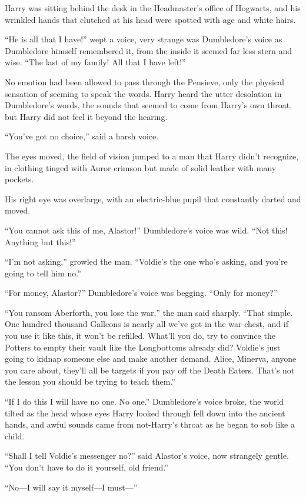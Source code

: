 \begin{em}
Harry was sitting behind the desk in the Headmaster’s office of Hogwarts, and his wrinkled hands that clutched at his head were spotted with age and white hairs.

“He is all that I have!” wept a voice, very strange was Dumbledore’s voice as Dumbledore himself remembered it, from the inside it seemed far less stern and wise. “The last of my family! All that I have left!”

No emotion had been allowed to pass through the Pensieve, only the physical sensation of seeming to speak the words. Harry heard the utter desolation in Dumbledore’s words, the sounds that seemed to come from Harry’s own throat, but Harry did not feel it beyond the hearing.

“You’ve got no choice,” said a harsh voice.

The eyes moved, the field of vision jumped to a man that Harry didn’t recognize, in clothing tinged with Auror crimson but made of solid leather with many pockets.

His right eye was overlarge, with an electric-blue pupil that constantly darted and moved.

“You cannot ask this of me, Alastor!” Dumbledore’s voice was wild. “Not this! Anything but this!”

“I’m not asking,” growled the man. “Voldie’s the one who’s asking, and you’re going to tell him no.”

“For money, Alastor?” Dumbledore’s voice was begging. “Only for money?”

“You ransom Aberforth, you lose the war,” the man said sharply. “That simple. One hundred thousand Galleons is nearly all we’ve got in the war-chest, and if you use it like this, it won’t be refilled. What’ll you do, try to convince the Potters to empty their vault like the Longbottoms already did? Voldie’s just going to kidnap someone else and make another demand. Alice, Minerva, anyone you care about, they’ll all be targets if you pay off the Death Eaters. That’s not the lesson you should be trying to teach them.”

“If I do this I will have no one. No one.” Dumbledore’s voice broke, the world tilted as the head whose eyes Harry looked through fell down into the ancient hands, and awful sounds came from not-Harry’s throat as he began to sob like a child.

“Shall I tell Voldie’s messenger no?” said Alastor’s voice, now strangely gentle. “You don’t have to do it yourself, old friend.”

“No—I will say it myself—I must—”
\end{em}

